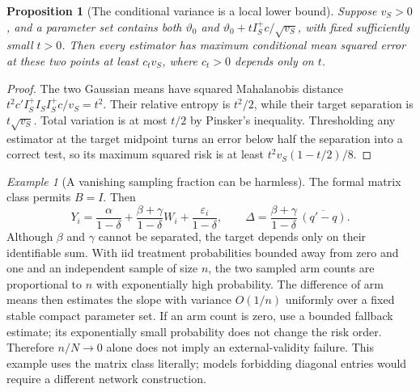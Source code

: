 \documentclass[11pt]{article}
\newtheorem{proposition}[theorem]{Proposition}
\theoremstyle{remark}
\newtheorem{example}[theorem]{Example}
\begin{document}
\begin{proposition}[The conditional variance is a local lower bound]
Suppose $v_S>0$, and a parameter set contains both $\vartheta_0$ and
$\vartheta_0+t I_S^+c/\sqrt{v_S}$, with fixed sufficiently small $t>0$. Then every estimator has maximum conditional mean squared error at these two points at least $c_t v_S$, where $c_t>0$ depends only on $t$.
\end{proposition}
\begin{proof}
The two Gaussian means have squared Mahalanobis distance
$t^2c'I_S^+I_S I_S^+c/v_S=t^2$. Their relative entropy is $t^2/2$, while their target separation is $t\sqrt{v_S}$. Total variation is at most $t/2$ by Pinsker's inequality. Thresholding any estimator at the target midpoint turns an error below half the separation into a correct test, so its maximum squared risk is at least $t^2v_S(1-t/2)/8$.
\end{proof}

\begin{example}[A vanishing sampling fraction can be harmless]
The formal matrix class permits $B=I$. Then
\[
 Y_i=\frac\alpha{1-\delta}+\frac{\beta+\gamma}{1-\delta}W_i
 +\frac{\varepsilon_i}{1-\delta},\qquad
 \Delta=\frac{\beta+\gamma}{1-\delta}\,\overline{(q'-q)}.
\]
Although $\beta$ and $\gamma$ cannot be separated, the target depends only on their identifiable sum. With iid treatment probabilities bounded away from zero and one and an independent sample of size $n$, the two sampled arm counts are proportional to $n$ with exponentially high probability. The difference of arm means then estimates the slope with variance $O(1/n)$ uniformly over a fixed stable compact parameter set. If an arm count is zero, use a bounded fallback estimate; its exponentially small probability does not change the risk order. Therefore $n/N\to0$ alone does not imply an external-validity failure. This example uses the matrix class literally; models forbidding diagonal entries would require a different network construction.
\end{example}
\end{document}
